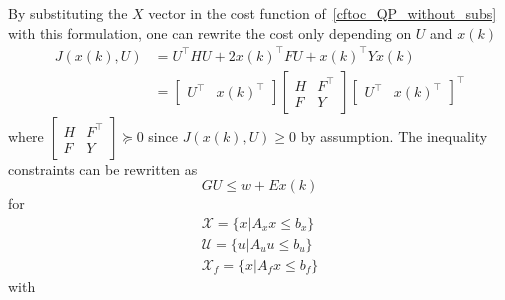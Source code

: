 By substituting the $X$ vector in the cost function of~\ref{cftoc_QP_without_subs} with this formulation, one can rewrite the cost only depending on $U$ and $x(k)$
\begin{align*}
    J(x(k), U) & = U^\top HU + 2{x(k)}^\top FU + {x(k)}^\top Y x(k) \\
               & = \begin{bmatrix}
                       U^\top & {x(k)}^\top
                   \end{bmatrix}
    \begin{bmatrix}
        H & F^\top \\
        F & Y
    \end{bmatrix}
    {\begin{bmatrix}
         U^\top & {x(k)}^\top
     \end{bmatrix}}^\top
\end{align*}
where $\begin{bmatrix}H&F^\top\\F&Y\end{bmatrix}\succeq0$ since $J(x(k),U) \geq 0$ by assumption.
\newpar{}
The inequality constraints can be rewritten as
\begin{equation*}
    GU\leq w + Ex(k)
\end{equation*}
for
\begin{gather*}
    \mathcal{X} = \{x|A_x x \leq b_x\} \\
    \mathcal{U} = \{u|A_u u \leq b_u\} \\
    \mathcal{X}_f = \{x|A_f x \leq b_f\}
\end{gather*}
with
